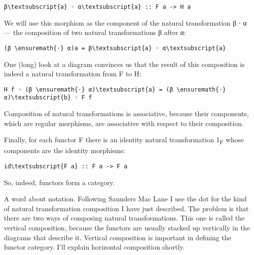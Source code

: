 \begin{Verbatim}[commandchars=\\\{\}]
β\textsubscript{a} ◦ α\textsubscript{a} :: F a -> H a
\end{Verbatim}
We will use this morphism as the component of the natural transformation
β ⋅ α --- the composition of two natural transformations β after α:

\begin{Verbatim}[commandchars=\\\{\}]
(β \ensuremath{⋅} α)a = β\textsubscript{a} ◦ α\textsubscript{a}
\end{Verbatim}

\begin{figure}[H]
\centering
{}
\end{figure}

\noindent
One (long) look at a diagram convinces us that the result of this
composition is indeed a natural transformation from F to H:

\begin{Verbatim}[commandchars=\\\{\}]
H f ◦ (β \ensuremath{⋅} α)\textsubscript{a} = (β \ensuremath{⋅} α)\textsubscript{b} ◦ F f
\end{Verbatim}

\begin{figure}[H]
\centering
{}
\end{figure}

\noindent
Composition of natural transformations is associative, because their
components, which are regular morphisms, are associative with respect to
their composition.

Finally, for each functor F there is an identity natural transformation
1\textsubscript{F} whose components are the identity morphisms:

\begin{Verbatim}[commandchars=\\\{\}]
id\textsubscript{F a} :: F a -> F a
\end{Verbatim}
So, indeed, functors form a category.

A word about notation. Following Saunders Mac Lane I use the dot for the
kind of natural transformation composition I have just described. The
problem is that there are two ways of composing natural transformations.
This one is called the vertical composition, because the functors are
usually stacked up vertically in the diagrams that describe it. Vertical
composition is important in defining the functor category. I'll explain
horizontal composition shortly.


